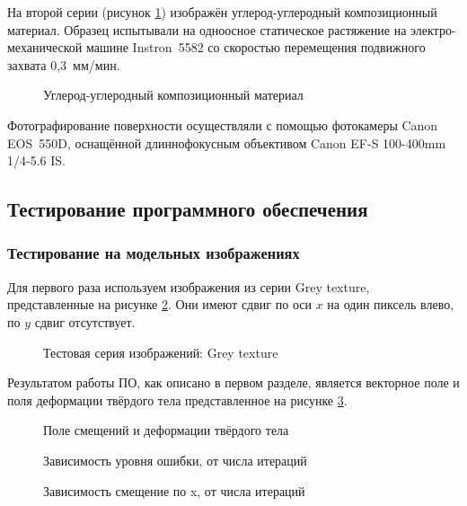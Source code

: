 На второй серии (рисунок \ref{pic:carbon_deform}) изображён углерод-углеродный композиционный материал. Образец испытывали на одноосное статическое растяжение на электро-механической машине Instron 5582 со скоростью перемещения подвижного захвата 0,3 мм/мин.
\begin{figure}[ht]
\caption{Углерод-углеродный композиционный материал}
\label{pic:carbon_deform}
\end{figure}

Фотографирование поверхности осуществляли с помощью фотокамеры Canon EOS 550D, оснащённой длиннофокусным объективом Canon EF-S 100-400mm 1/4-5.6 IS.

\subsection{Тестирование программного обеспечения}
\subsubsection{Тестирование на модельных изображениях}

Для первого раза используем изображения из серии Grey texture, представленные на рисунке \ref{pic:gray_set}. Они имеют сдвиг по оси $x$ на один пиксель влево, по $y$ сдвиг отсутствует.

\begin{figure}[ht]
\caption{Тестовая серия изображений: Grey texture}
\label{pic:gray_set}
\end{figure}

Результатом работы ПО, как описано в первом разделе, является векторное поле и поля деформации твёрдого тела представленное на рисунке \ref{pic:gray_set_out}.

\begin{figure}[ht]
\caption{Поле смещений и деформации твёрдого тела}
\label{pic:gray_set_out}
\end{figure}

\begin{figure}[ht]
\caption{Зависимость уровня ошибки, от числа итераций}
\label{pic:gray_set_func_iteration}
\end{figure}

\begin{figure}[ht]
\caption{Зависимость смещение по x, от числа итераций}
\label{pic:gray_set_func_iter_vector}
\end{figure}

